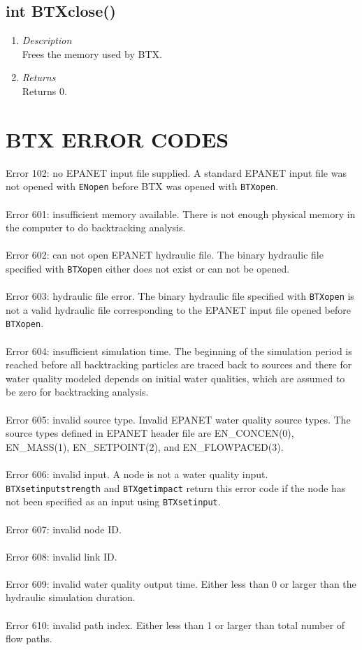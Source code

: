 \documentclass[12pt,letterpaper]{article}
\begin{document}
\subsection*{int BTXclose()}
\begin{enumerate}
\item {\it Description}\\Frees the memory used by BTX.
\item {\it Returns}\\Returns 0.
\end{enumerate}

\section*{BTX ERROR CODES}
Error 102: no EPANET input file supplied. A standard EPANET input
file was not opened with \texttt{ENopen} before BTX was opened with
\texttt{BTXopen}.\\
\\Error 601: insufficient memory available. There
is not enough physical memory in the computer to do backtracking
analysis.\\
\\Error 602: can not open EPANET hydraulic file. The binary hydraulic
file specified with \texttt{BTXopen} either does not exist or can
not be opened.\\
\\Error 603: hydraulic file error. The binary hydraulic file
specified with \texttt{BTXopen} is not a valid hydraulic file
corresponding to the EPANET input file opened before
\texttt{BTXopen}.\\
\\Error 604: insufficient simulation time. The beginning of the
simulation period is reached before all backtracking particles are
traced back to sources and there for water quality modeled depends
on initial water qualities, which are assumed to be zero for
backtracking analysis.\\
\\Error 605: invalid source type. Invalid EPANET water quality
source types. The source types defined in EPANET header file are
EN\_CONCEN(0), EN\_MASS(1), EN\_SETPOINT(2), and EN\_FLOWPACED(3).\\
\\Error 606: invalid input. A node is not a water quality input. \texttt{BTXsetinputstrength} and \texttt{BTXgetimpact} return this error code if the node has not been specified as an input using \texttt{BTXsetinput}.\\
\\Error 607: invalid node ID.\\
\\Error 608: invalid link ID.\\
\\Error 609: invalid water quality output time. Either less than 0
or larger than the hydraulic simulation duration.\\
\\Error 610: invalid path index. Either less than 1 or larger than
total number of flow paths.

\end{document}
